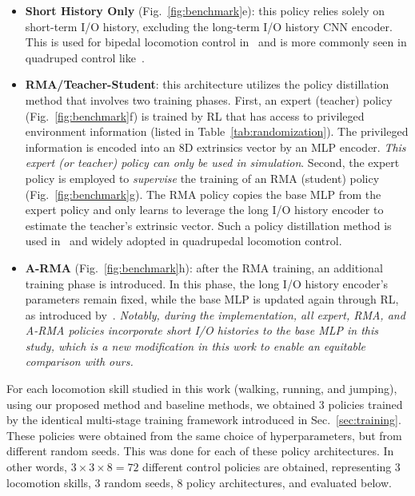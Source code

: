 \begin{itemize}[leftmargin=9pt]
    \item \textbf{Short History Only} (Fig.~\ref{fig:benchmark}e): this policy relies solely on short-term I/O history, excluding the long-term I/O history CNN encoder. This is used for bipedal locomotion control in~\cite{li2021reinforcement} and is more commonly seen in quadruped control like~\cite{huang2022creating,escontrela2022adversarial,feng2023genloco}.
    \item \textbf{RMA/Teacher-Student}: this architecture utilizes the policy distillation method that involves two training phases. First, an expert (teacher) policy (Fig.~\ref{fig:benchmark}f) is trained by RL that has access to privileged environment information (listed in Table~\ref{tab:randomization}). The privileged information is encoded into an $8$D extrinsics vector by an MLP encoder. \emph{This expert (or teacher) policy can only be used in simulation}. Second, the expert policy is employed to \textit{supervise} the training of an RMA (student) policy (Fig.~\ref{fig:benchmark}g). 
    The RMA policy copies the base MLP from the expert policy and only learns to leverage the long I/O history encoder to estimate the teacher's extrinsic vector. 
    Such a policy distillation method is used in~\cite{lee2020learning,kumar2021rma} and widely adopted in quadrupedal locomotion control.
    \item \textbf{A-RMA} (Fig.~\ref{fig:benchmark}h): 
    after the RMA training, an additional training phase is introduced. In this phase, the long I/O history encoder's parameters remain fixed, while the base MLP is updated again through RL, as introduced by~\cite{kumar2022adapting}. 
    \emph{Notably, during the implementation, all expert, RMA, and A-RMA policies incorporate short I/O histories to the base MLP in this study, which is a new modification in this work to enable an equitable comparison with ours.}
\end{itemize}





For each locomotion skill studied in this work (walking, running, and jumping), using our proposed method and baseline methods, we obtained 3 policies trained by the identical multi-stage training framework introduced in Sec.~\ref{sec:training}. These policies were obtained from the same choice of hyperparameters, but from different random seeds. This was done for each of these policy architectures. 
In other words, $3\times3\times8=72$ different control policies are obtained, representing 3 locomotion skills, 3 random seeds, 8 policy architectures, and evaluated below.   








